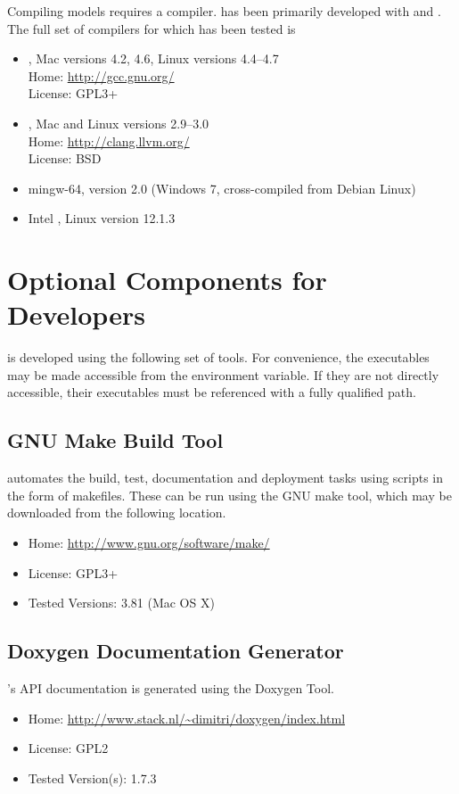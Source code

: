 Compiling \Stan models requires a \Cpp compiler.  \Stan has been
primarily developed with \clang and \gpp.  The full set of compilers
for which \Stan has been tested is
%
\begin{itemize}
%
\item \gpp, Mac versions 4.2, 4.6, Linux versions 4.4--4.7
\\
Home: \url{http://gcc.gnu.org/}
\\
License: GPL3+
%
\item \clang, Mac and Linux versions 2.9--3.0
\\
Home: \url{http://clang.llvm.org/}
\\
License: BSD
%
\item mingw-64, version 2.0 (Windows 7, cross-compiled from Debian Linux)
%
\item Intel \Cpp, Linux version 12.1.3
%
\end{itemize}
%

\section{Optional Components for Developers}

\Stan is developed using the following set of tools.  For convenience,
the executables may be made accessible from the 
environment variable.  If they are not directly accessible, their
executables must be referenced with a fully qualified path.


\subsection{GNU Make Build Tool}

\Stan automates the build, test, documentation and deployment tasks
using scripts in the form of makefiles.  These can be run using the
GNU make tool, which may be downloaded from the following
location.
\begin{itemize}
\item Home: \url{http://www.gnu.org/software/make/}
\item License: GPL3+
\item Tested Versions: 3.81 (Mac OS X)
\end{itemize}
%


\subsection{Doxygen Documentation Generator}

\Stan's API documentation is generated using the Doxygen Tool.
%
\begin{itemize}
\item Home: \url{http://www.stack.nl/~dimitri/doxygen/index.html}
\item License: GPL2
\item Tested Version(s): 1.7.3
\end{itemize}


